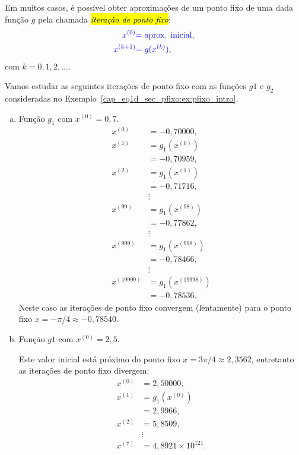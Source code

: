 Em muitos casos, é possível obter aproximações de um ponto fixo de uma dada função $g$ pela chamada \hl{\emph{iteração de ponto fixo}}:
\begin{align}
  {\color{blue}x^{(0)}} &{\color{blue}= \text{aprox. inicial}},\\
  {\color{blue}x^{(k+1)}} &{\color{blue}= g(x^{(k)})},
\end{align}
com $k=0,1,2,\ldots$.

\begin{ex}
  Vamos estudar as seguintes iterações de ponto fixo com as funções $g1$ e $g_2$ consideradas no Exemplo~\ref{cap_eq1d_sec_pfixo:ex:pfixo_intro}.
  \begin{enumerate}[a)]
  \item Função $g_1$ com $x^{(0)} = 0,7$.
    \begin{align}
      x^{(0)} &= -0,70000,\\
      x^{(1)} &= g_1\left(x^{(0)}\right)\\
              &= -0,70959,\\
      x^{(2)} &= g_1\left(x^{(1)}\right)\\
              &=-0,71716,\\
              &\vdots \nonumber\\
      x^{(99)} &= g_1\left(x^{(98)}\right)\\
              &= -0,77862,\\
              &\vdots \nonumber\\
      x^{(999)} &= g_1\left(x^{(998)}\right)\\
              &= -0,78466,\\    
              &\vdots \nonumber\\
      x^{(19999)} &= g_1\left(x^{(19998)}\right)\\
              &= -0,78536.
    \end{align}
    Neste caso as iterações de ponto fixo convergem (lentamente) para o ponto fixo $x=-\pi/4\approx -0,78540$.

  \item Função $g1$ com $x^{(0)} = 2,5$.
    
    Este valor inicial está próximo do ponto fixo $x=3\pi/4\approx 2,3562$, entretanto as iterações de ponto fixo divergem:
    \begin{align}
      x^{(0)} &= 2,50000,\\
      x^{(1)} &= g_1\left(x^{(0)}\right)\\
              &= 2,9966,\\
      x^{(2)} &= 5,8509,\\
              &\vdots \nonumber\\
      x^{(7)} &= 4,8921\times 10^{121}.
    \end{align}
    

\end{enumerate}
\end{ex}
